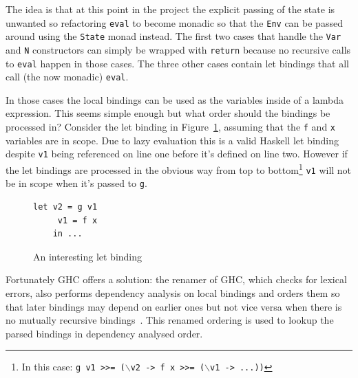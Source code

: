 The idea is that at this point in the project the explicit passing of the state is unwanted so refactoring \texttt{eval} to become monadic so that the \texttt{Env} can be passed around using the \texttt{State} monad instead. The first two cases that handle the \texttt{Var} and \texttt{N} constructors can simply be wrapped with \texttt{return} because no recursive calls to \texttt{eval} happen in those cases. The three other cases contain let bindings that all call (the now monadic) \texttt{eval}. 

In those cases the local bindings can be used as the variables inside of a lambda expression. This seems simple enough but what order should the bindings be processed in? Consider the let binding in Figure~\ref{intLet}, assuming that the \texttt{f} and \texttt{x} variables are in scope. Due to lazy evaluation this is a valid Haskell let binding despite \texttt{v1} being referenced on line one before it's defined on line two. However if the let bindings are processed in the obvious way from top to bottom\footnote{In this case: \texttt{g v1 >>= ($\backslash$v2 -> f x >>= ($\backslash$v1 -> ...))}} \texttt{v1} will not be in scope when it's passed to \texttt{g}.  

\begin{figure}[t]
\begin{lstlisting}
let v2 = g v1
     v1 = f x
    in ...
\end{lstlisting}
\caption{An interesting let binding}
\label{intLet}
\end{figure}

Fortunately GHC offers a solution: the renamer of GHC, which checks for lexical errors, also performs dependency analysis on local bindings and orders them so that later bindings may depend on earlier ones but not vice versa when there is no mutually recursive bindings~\citep{ghcApi}. This renamed ordering is used to lookup the parsed bindings in dependency analysed order.

